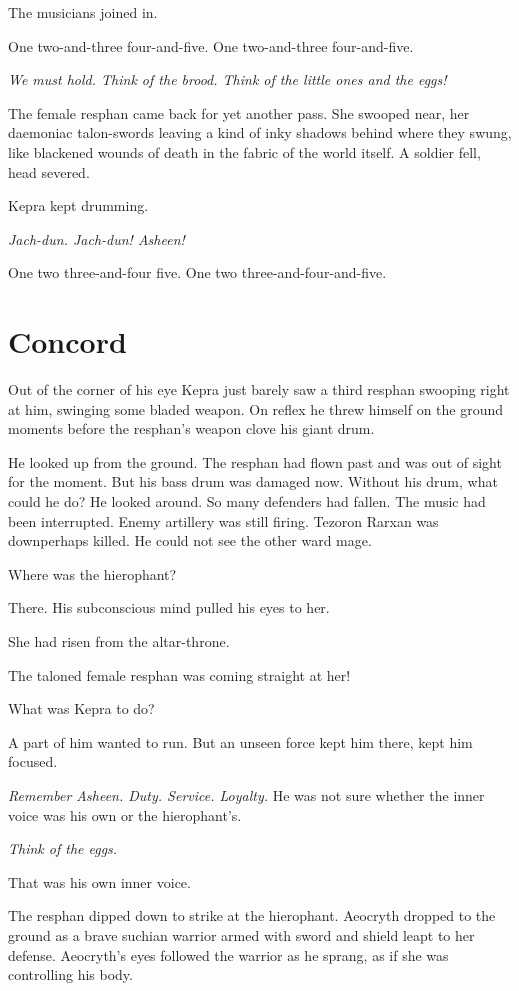\documentclass
  [a4paper,
   12pt,
   oneside
  ]%
  {article}
\newcommand{\drum}[1]{\textsf{#1}}
\begin{document}
The musicians joined in.

\drum{One two-and-three four-and-five. One two-and-three four-and-five.}

\emph{We must hold. Think of the brood. Think of the little ones and the eggs!}

The female resphan came back for yet another pass. She swooped near, her daemoniac talon-swords leaving a kind of inky shadows behind where they swung, like blackened wounds of death in the fabric of the world itself. 
A soldier fell, head severed. 

Kepra kept drumming. 

\emph{Jach-dun. Jach-dun! Asheen!}

\drum{One two three-and-four five. One two three-and-four-and-five.}



\section{Concord}
Out of the corner of his eye Kepra just barely saw a third resphan swooping right at him, swinging some bladed weapon. On reflex he threw himself on the ground moments before the resphan's weapon clove his giant drum. 

He looked up from the ground. 
The resphan had flown past and was out of sight for the moment. 
But his bass drum was damaged now.
Without his drum, what could he do? 
He looked around. 
So many defenders had fallen. 
The music had been interrupted.
Enemy artillery was still firing.
Tezoron Rarxan was down\dash{}perhaps killed. 
He could not see the other ward mage. 

Where was the hierophant? 

There.
His subconscious mind pulled his eyes to her. 

She had risen from the altar-throne.

The taloned female resphan was coming straight at her! 

What was Kepra to do? 

A part of him wanted to run. But an unseen force kept him there, kept him focused.

\emph{Remember Asheen. Duty. Service. Loyalty.} 
He was not sure whether the inner voice was his own or the hierophant's.

\emph{Think of the eggs.} 

That was his own inner voice.

The resphan dipped down to strike at the hierophant. 
Aeocryth dropped to the ground as a brave suchian warrior armed with sword and shield leapt to her defense. 
Aeocryth's eyes followed the warrior as he sprang, as if she was controlling his body.
\end{document}
